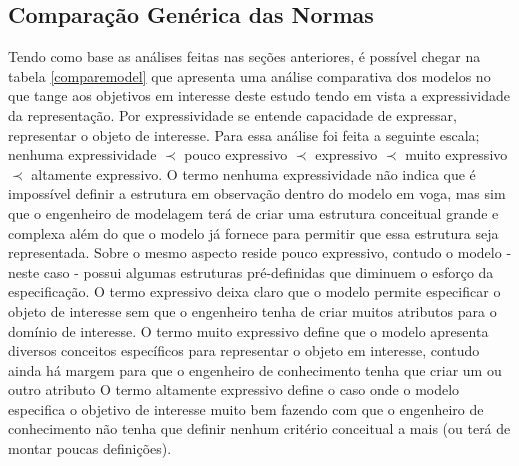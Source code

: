 \subsection{Comparação Genérica das Normas}

Tendo como base as análises feitas nas seções anteriores, é possível chegar na tabela \ref{comparemodel} que apresenta uma análise comparativa dos modelos no que tange aos objetivos em 
interesse deste estudo tendo em vista a expressividade da representação. Por expressividade se entende capacidade de expressar, representar o objeto de interesse. Para essa análise 
foi feita a seguinte escala; nenhuma expressividade $\prec$ pouco expressivo $\prec$ expressivo $\prec$ muito expressivo $\prec$ altamente expressivo. O termo nenhuma expressividade 
não indica que é impossível definir a estrutura em observação dentro do modelo em voga, mas sim que o engenheiro de modelagem terá de criar uma estrutura conceitual grande e complexa 
além do que o modelo já fornece para permitir que essa estrutura seja representada. Sobre o mesmo aspecto reside pouco expressivo, contudo o modelo - neste caso - possui algumas 
estruturas pré-definidas que diminuem o esforço da especificação. O termo expressivo deixa claro que o modelo permite especificar o objeto de interesse sem que o engenheiro 
tenha de criar muitos atributos para o domínio de interesse. O termo muito expressivo define que o modelo apresenta diversos conceitos específicos para representar o objeto em interesse, 
contudo ainda há margem para que o engenheiro de conhecimento tenha que criar um ou outro atributo O termo altamente expressivo define o caso onde o modelo especifica o objetivo 
de interesse muito bem fazendo com que o engenheiro de conhecimento não tenha que definir nenhum critério conceitual a mais (ou terá de montar poucas definições).   

